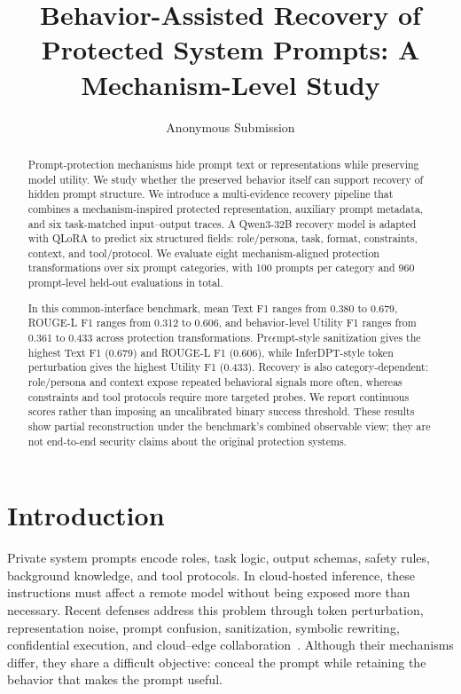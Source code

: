 \documentclass[letterpaper]{article} %
\title{Behavior-Assisted Recovery of Protected System Prompts: A Mechanism-Level Study}
\author{Anonymous Submission}
\begin{document}
\maketitle

\begin{abstract}
Prompt-protection mechanisms hide prompt text or representations while preserving model utility.  We study whether the preserved behavior itself can support recovery of hidden prompt structure.  We introduce a multi-evidence recovery pipeline that combines a mechanism-inspired protected representation, auxiliary prompt metadata, and six task-matched input--output traces.  A Qwen3-32B recovery model is adapted with QLoRA to predict six structured fields: role/persona, task, format, constraints, context, and tool/protocol.  We evaluate eight mechanism-aligned protection transformations over six prompt categories, with 100 prompts per category and 960 prompt-level held-out evaluations in total.

In this common-interface benchmark, mean Text F1 ranges from 0.380 to 0.679, ROUGE-L F1 ranges from 0.312 to 0.606, and behavior-level Utility F1 ranges from 0.361 to 0.433 across protection transformations.  Pr$\epsilon\epsilon$mpt-style sanitization gives the highest Text F1 (0.679) and ROUGE-L F1 (0.606), while InferDPT-style token perturbation gives the highest Utility F1 (0.433).  Recovery is also category-dependent: role/persona and context expose repeated behavioral signals more often, whereas constraints and tool protocols require more targeted probes.  We report continuous scores rather than imposing an uncalibrated binary success threshold.  These results show partial reconstruction under the benchmark's combined observable view; they are not end-to-end security claims about the original protection systems.
\end{abstract}

\section{Introduction}

Private system prompts encode roles, task logic, output schemas, safety rules, background knowledge, and tool protocols.  In cloud-hosted inference, these instructions must affect a remote model without being exposed more than necessary.  Recent defenses address this problem through token perturbation, representation noise, prompt confusion, sanitization, symbolic rewriting, confidential execution, and cloud--edge collaboration~\citep{mai2026confusionprompt,tong2025inferdpt,mai2024split,chowdhury2025preempt,lin2024emojiprompt,lee2024confidential,zhan2026prism}.  Although their mechanisms differ, they share a difficult objective: conceal the prompt while retaining the behavior that makes the prompt useful.
\end{document}
